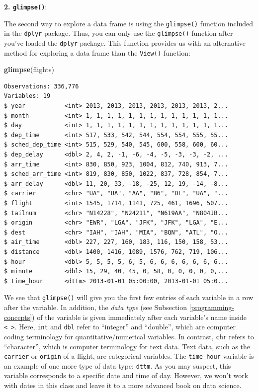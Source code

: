 \documentclass[12pt, krantz2,]{krantz}
\makeatletter
\newenvironment{Shaded}{\begin{snugshade}}{\end{snugshade}}
\newcommand{\KeywordTok}[1]{\textcolor[rgb]{0.27,0.27,0.27}{\textbf{#1}}}
\newcommand{\NormalTok}[1]{#1}
\newenvironment{kframe}{%
\medskip{}
\setlength{\fboxsep}{.8em}
 \def\at@end@of@kframe{}%
 \ifinner\ifhmode%
  \def\at@end@of@kframe{\end{minipage}}%
  \begin{minipage}{\columnwidth}%
 \fi\fi%
 \def\FrameCommand##1{\hskip\@totalleftmargin \hskip-\fboxsep
 \colorbox{shadecolor}{##1}\hskip-\fboxsep
     \hskip-\linewidth \hskip-\@totalleftmargin \hskip\columnwidth}%
 \MakeFramed {\advance\hsize-\width
   \@totalleftmargin\z@ \linewidth\hsize
   \@setminipage}}%
 {\par\unskip\endMakeFramed%
 \at@end@of@kframe}
\renewenvironment{Shaded}{\begin{kframe}}{\end{kframe}}
\makeatother
\begin{document}
\textbf{2. \texttt{glimpse()}}:

The second way to explore a data frame is using the \texttt{glimpse()} function included in the \texttt{dplyr} package. Thus, you can only use the \texttt{glimpse()} function after you've loaded the \texttt{dplyr} package. This function provides us with an alternative method for exploring a data frame than the \texttt{View()} function:

\begin{Shaded}
\begin{Highlighting}[]
\KeywordTok{glimpse}\NormalTok{(flights)}
\end{Highlighting}
\end{Shaded}

\begin{verbatim}
Observations: 336,776
Variables: 19
$ year           <int> 2013, 2013, 2013, 2013, 2013, 2013, 2...
$ month          <int> 1, 1, 1, 1, 1, 1, 1, 1, 1, 1, 1, 1, 1...
$ day            <int> 1, 1, 1, 1, 1, 1, 1, 1, 1, 1, 1, 1, 1...
$ dep_time       <int> 517, 533, 542, 544, 554, 554, 555, 55...
$ sched_dep_time <int> 515, 529, 540, 545, 600, 558, 600, 60...
$ dep_delay      <dbl> 2, 4, 2, -1, -6, -4, -5, -3, -3, -2, ...
$ arr_time       <int> 830, 850, 923, 1004, 812, 740, 913, 7...
$ sched_arr_time <int> 819, 830, 850, 1022, 837, 728, 854, 7...
$ arr_delay      <dbl> 11, 20, 33, -18, -25, 12, 19, -14, -8...
$ carrier        <chr> "UA", "UA", "AA", "B6", "DL", "UA", "...
$ flight         <int> 1545, 1714, 1141, 725, 461, 1696, 507...
$ tailnum        <chr> "N14228", "N24211", "N619AA", "N804JB...
$ origin         <chr> "EWR", "LGA", "JFK", "JFK", "LGA", "E...
$ dest           <chr> "IAH", "IAH", "MIA", "BQN", "ATL", "O...
$ air_time       <dbl> 227, 227, 160, 183, 116, 150, 158, 53...
$ distance       <dbl> 1400, 1416, 1089, 1576, 762, 719, 106...
$ hour           <dbl> 5, 5, 5, 5, 6, 5, 6, 6, 6, 6, 6, 6, 6...
$ minute         <dbl> 15, 29, 40, 45, 0, 58, 0, 0, 0, 0, 0,...
$ time_hour      <dttm> 2013-01-01 05:00:00, 2013-01-01 05:0...
\end{verbatim}

We see that \texttt{glimpse()} will give you the first few entries of each variable in a row after the variable. In addition, the \emph{data type} (see Subsection \ref{programming-concepts}) of the variable is given immediately after each variable's name inside \texttt{\textless{}\ \textgreater{}}. Here, \texttt{int} and \texttt{dbl} refer to ``integer'' and ``double'', which are computer coding terminology for quantitative/numerical variables. In contrast, \texttt{chr} refers to ``character'', which is computer terminology for text data. Text data, such as the \texttt{carrier} or \texttt{origin} of a flight, are categorical variables. The \texttt{time\_hour} variable is an example of one more type of data type: \texttt{dttm}. As you may suspect, this variable corresponds to a specific date and time of day. However, we won't work with dates in this class and leave it to a more advanced book on data science.
\end{document}
